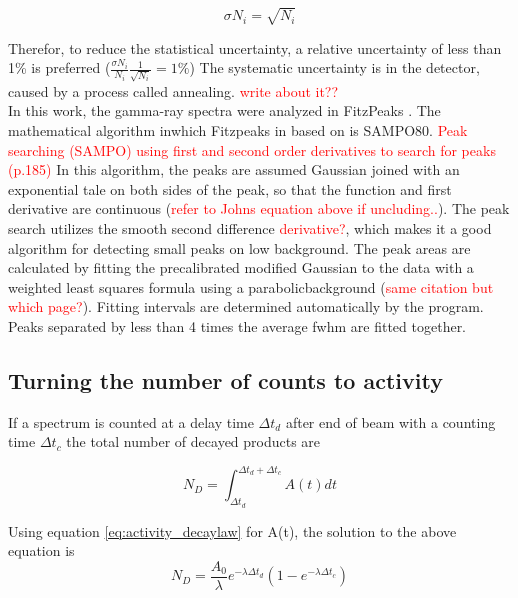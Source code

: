 \begin{equation}
    \sigma N_i = \sqrt{N_i}
\end{equation}

Therefor, to reduce the statistical uncertainty, a relative uncertainty of less than 1\% is preferred ($\frac{\sigma N_i}{N_i}\frac{1}{\sqrt{N_i}}=1\%$) 
The systematic uncertainty is in the detector, caused by a process called annealing. \textcolor{red}{write about it??} \\




\noindent 
In this work, the gamma-ray spectra were analyzed in FitzPeaks \cite{Fitzgerald2009}. The mathematical algorithm inwhich Fitzpeaks in based on is SAMPO80\cite{Koskelo1981}. \textcolor{red}{Peak searching (SAMPO) using first and second order derivatives to search for peaks \cite{Gilmore2008} (p.185)}  In this algorithm, the peaks are assumed Gaussian joined with an exponential tale on both sides of the peak, so that the function and first derivative are continuous (\textcolor{red}{refer to Johns equation above if uncluding..}). The peak search utilizes the smooth second difference \textcolor{red}{derivative?}, which makes it a good algorithm for detecting small peaks on low background\cite{Koskelo1981}. The peak areas are calculated by fitting the precalibrated modified Gaussian to the data with a weighted least squares formula using a parabolicbackground (\textcolor{red}{same citation but which page?}).  Fitting intervals are determined automatically by the program.  Peaks separated by less than 4 times the average fwhm are fitted together.  \\


\subsection{Turning the number of counts to activity}

\noindent 
If a spectrum is counted at a delay time $\Delta t_d$ after end of beam with a counting time $\Delta t_c$  the total number of decayed products are 

\begin{equation}
    N_D = \int_{\Delta t_d}^{\Delta t_d + \Delta t_c} A(t) dt
\end{equation}

Using equation \ref{eq:activity_decaylaw} for A(t), the solution to the above equation is 
\begin{equation} \label{eq:numb_of_decayed}
    N_D= \frac{A_0}{\lambda}e^{-\lambda \Delta t_d}(1-e^{-\lambda \Delta t_c})
\end{equation}

